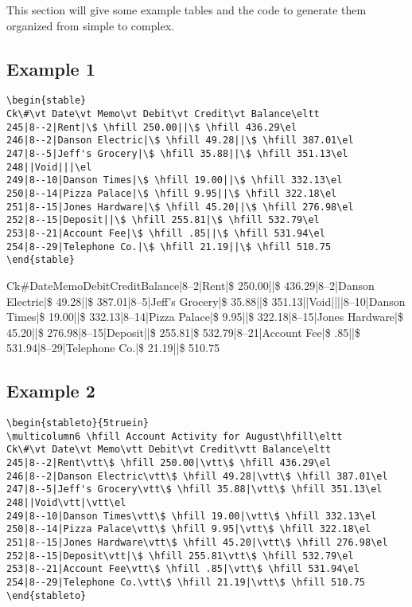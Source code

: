 \documentclass{article}
\begin{document}
This section will give some example tables and the code to generate them
organized from simple to complex.

\subsection{Example 1}

\begin{verbatim}
\begin{stable}
Ck\#\vt Date\vt Memo\vt Debit\vt Credit\vt Balance\eltt
245|8--2|Rent|\$ \hfill 250.00||\$ \hfill 436.29\el
246|8--2|Danson Electric|\$ \hfill 49.28||\$ \hfill 387.01\el
247|8--5|Jeff's Grocery|\$ \hfill 35.88||\$ \hfill 351.13\el
248||Void|||\el
249|8--10|Danson Times|\$ \hfill 19.00||\$ \hfill 332.13\el
250|8--14|Pizza Palace|\$ \hfill 9.95||\$ \hfill 322.18\el
251|8--15|Jones Hardware|\$ \hfill 45.20||\$ \hfill 276.98\el
252|8--15|Deposit||\$ \hfill 255.81|\$ \hfill 532.79\el
253|8--21|Account Fee|\$ \hfill .85||\$ \hfill 531.94\el
254|8--29|Telephone Co.|\$ \hfill 21.19||\$ \hfill 510.75
\end{stable}
\end{verbatim}

\begin{stable}
Ck\#\vt Date\vt Memo\vt Debit\vt Credit\vt Balance|8--2|Rent|\$ \hfill 250.00||\$ \hfill 436.29|8--2|Danson Electric|\$ \hfill 49.28||\$ \hfill 387.01|8--5|Jeff's Grocery|\$ \hfill 35.88||\$ \hfill 351.13||Void||||8--10|Danson Times|\$ \hfill 19.00||\$ \hfill 332.13|8--14|Pizza Palace|\$ \hfill 9.95||\$ \hfill 322.18|8--15|Jones Hardware|\$ \hfill 45.20||\$ \hfill 276.98|8--15|Deposit||\$ \hfill 255.81|\$ \hfill 532.79|8--21|Account Fee|\$ \hfill .85||\$ \hfill 531.94|8--29|Telephone Co.|\$ \hfill 21.19||\$ \hfill 510.75
\end{stable}

\subsection{Example 2}

\begin{verbatim}
\begin{stableto}{5truein}
\multicolumn6 \hfill Account Activity for August\hfill\eltt
Ck\#\vt Date\vt Memo\vtt Debit\vt Credit\vtt Balance\eltt
245|8--2|Rent\vtt\$ \hfill 250.00|\vtt\$ \hfill 436.29\el
246|8--2|Danson Electric\vtt\$ \hfill 49.28|\vtt\$ \hfill 387.01\el
247|8--5|Jeff's Grocery\vtt\$ \hfill 35.88|\vtt\$ \hfill 351.13\el
248||Void\vtt|\vtt\el
249|8--10|Danson Times\vtt\$ \hfill 19.00|\vtt\$ \hfill 332.13\el
250|8--14|Pizza Palace\vtt\$ \hfill 9.95|\vtt\$ \hfill 322.18\el
251|8--15|Jones Hardware\vtt\$ \hfill 45.20|\vtt\$ \hfill 276.98\el
252|8--15|Deposit\vtt|\$ \hfill 255.81\vtt\$ \hfill 532.79\el
253|8--21|Account Fee\vtt\$ \hfill .85|\vtt\$ \hfill 531.94\el
254|8--29|Telephone Co.\vtt\$ \hfill 21.19|\vtt\$ \hfill 510.75
\end{stableto}
\end{verbatim}
\end{document}
